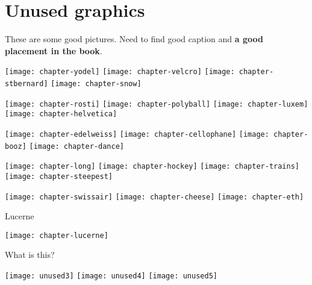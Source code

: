 \section{Unused graphics}

These are some good pictures. Need to find good caption and \textbf{a good placement in the book}.

\texttt{[image: chapter-yodel]}
\texttt{[image: chapter-velcro]}
\texttt{[image: chapter-stbernard]}
\texttt{[image: chapter-snow]}

\texttt{[image: chapter-rosti]}
\texttt{[image: chapter-polyball]}
\texttt{[image: chapter-luxem]}
\texttt{[image: chapter-helvetica]}

\texttt{[image: chapter-edelweiss]}
\texttt{[image: chapter-cellophane]}
\texttt{[image: chapter-booz]}
\texttt{[image: chapter-dance]}

\texttt{[image: chapter-long]}
\texttt{[image: chapter-hockey]}
\texttt{[image: chapter-trains]}
\texttt{[image: chapter-steepest]}

\texttt{[image: chapter-swissair]}
\texttt{[image: chapter-cheese]}
\texttt{[image: chapter-eth]}

Lucerne

\texttt{[image: chapter-lucerne]}

What is this?

\texttt{[image: unused3]}
\texttt{[image: unused4]}
\texttt{[image: unused5]}

